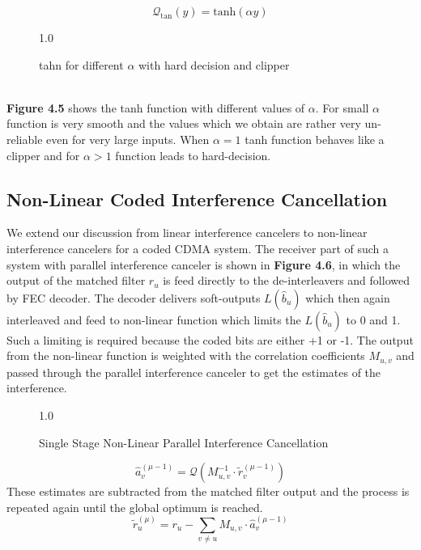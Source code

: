 \begin{equation}
\mathcal{Q}_{\mathrm{tan}}(y)=\mathrm{tanh}(\alpha y)
\end{equation}
\begin{figure}[htb]
\centerline{  {1.0} }
\caption{tahn for different $\alpha$ with hard decision and clipper}
\end{figure}\\
\textbf{Figure 4.5} shows the tanh function with different values of $\alpha$. For small $\alpha$ function is very smooth and the values which we obtain are rather very un-reliable even for very large inputs. When $\alpha=1$ tanh function behaves like a clipper and for $\alpha>1$ function leads to hard-decision.
\subsection{Non-Linear Coded Interference Cancellation}
We extend our discussion from linear interference cancelers to non-linear interference cancelers for a coded CDMA system. The receiver part of such a system with parallel interference canceler is shown in \textbf{Figure 4.6}, in which the output of the matched filter $r_u$ is feed directly to the de-interleavers and followed by FEC decoder. The decoder delivers soft-outputs $L(\hat{b}_u)$ which then again interleaved and feed to non-linear function which limits the $L(\hat{b}_u)$ to 0 and 1. Such a limiting is required because the coded bits are either +1 or -1. The output from the non-linear function is weighted with the correlation coefficients $M_{u,v}$ and passed through the parallel interference canceler to get the estimates of the interference. 
\begin{figure}[htb]
\centerline{  {1.0} }
\caption{Single Stage Non-Linear Parallel Interference Cancellation}
\end{figure}
\begin{equation}
\hat{a}_v^{(\mu-1)}=\mathcal{Q}\left(M_{u,v}^{-1}\cdot \tilde{r}_v^{(\mu-1)}\right)
\end{equation}
These estimates are subtracted from the matched filter output and the process is repeated again until the global optimum is reached.
\begin{equation}
\tilde{r}_u^{(\mu)}=r_u-\sum\limits_{v\ne u}M_{u,v}\cdot \hat{a}_v^{(\mu-1)}
\end{equation}
